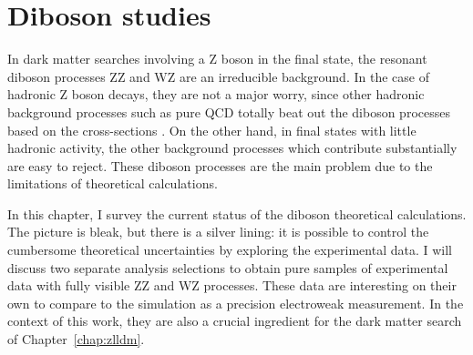 \chapter{Diboson studies}
\label{chap:dibosons}

In dark matter searches involving a Z boson in the final state, 
the resonant diboson processes ZZ and WZ are an irreducible background.
In the case of hadronic Z boson decays, they are not a major worry, since
other hadronic background processes such as pure QCD totally beat out the
diboson processes based on the cross-sections \cite{Sirunyan:2017jix}.
On the other hand, in final states with little hadronic activity,
the other background processes which contribute substantially are easy to reject.
These diboson processes are the main problem due to the limitations
of theoretical calculations.

In this chapter, I survey the current status of the diboson theoretical calculations.
The picture is bleak, but there is a silver lining:
it is possible to control the cumbersome theoretical uncertainties by exploring the experimental data.
I will discuss two separate analysis selections to obtain pure samples of experimental data
with fully visible ZZ and WZ processes.
These data are interesting on their own to compare to the simulation as a precision electroweak measurement.
In the context of this work, they are also a crucial ingredient
for the dark matter search of Chapter~\ref{chap:zlldm}.

